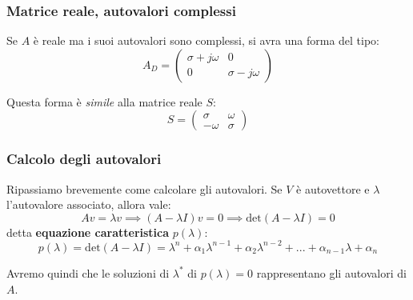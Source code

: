 \documentclass[a4paper,11pt]{article}
\begin{document}
\subsubsection{Matrice reale, autovalori complessi}
Se $A$ è reale ma i suoi autovalori sono complessi, si avra una forma del tipo:
$$
A_D = \begin{pmatrix}
	\sigma + j\omega & 0 \\
	0 & \sigma - j\omega
\end{pmatrix}
$$

Questa forma è \textit{simile} alla matrice reale $S$:
$$
S = \begin{pmatrix}
	\sigma & \omega \\
	-\omega & \sigma
\end{pmatrix}
$$

\subsubsection{Calcolo degli autovalori}
Ripassiamo brevemente come calcolare gli autovalori.
Se $V$ è autovettore e $\lambda$ l'autovalore associato, allora vale:
$$
Av = \lambda v \implies (A - \lambda I)v = 0 \implies \mathrm{det} (A - \lambda I) = 0
$$
detta \textbf{equazione caratteristica} $p(\lambda)$: 
$$
p(\lambda) = \mathrm{det} (A - \lambda I) = \lambda^n + \alpha_1 \lambda^{n - 1} + \alpha_2 \lambda^{n - 2} + ... + \alpha_{n - 1} \lambda + \alpha_n
$$

Avremo quindi che le soluzioni di $\lambda^*$ di $p(\lambda) = 0$ rappresentano gli autovalori di $A$.
\end{document}
